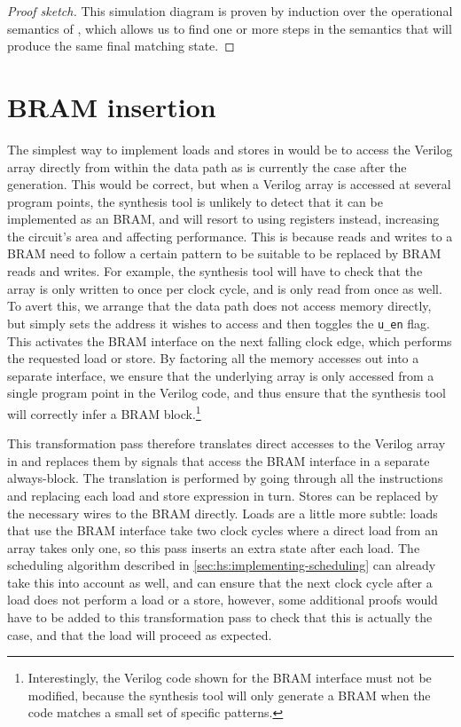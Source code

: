 \begin{proof}[Proof sketch]
  This simulation diagram is proven by induction over the operational semantics
  of \rtlsubpar{}, which allows us to find one or more steps in the \htl{} semantics that
  will produce the same final matching state.
\end{proof}

\section{BRAM insertion}%
\label{sec:hg:bram-insertion}

The simplest way to implement loads and stores in \vericert{} would be to access
the Verilog array directly from within the data path as is currently the case
after the \htl{} generation. This would be correct, but when a Verilog array is
accessed at several program points, the synthesis tool is unlikely to detect
that it can be implemented as an \gls{BRAM}, and will resort to using registers
instead, increasing the circuit's area and affecting performance.  This is
because reads and writes to a \gls{BRAM} need to follow a certain pattern to be
suitable to be replaced by \gls{BRAM} reads and writes.  For example, the
synthesis tool will have to check that the array is only written to once per
clock cycle, and is only read from once as well.  To avert this, we arrange that
the data path does not access memory directly, but simply sets the address it
wishes to access and then toggles the \texttt{u\_en} flag. This activates the
\gls{BRAM} interface on the next falling clock edge, which performs the
requested load or store. By factoring all the memory accesses out into a
separate interface, we ensure that the underlying array is only accessed from a
single program point in the Verilog code, and thus ensure that the synthesis
tool will correctly infer a \gls{BRAM} block.\footnote{Interestingly, the
  Verilog code shown for the \gls{BRAM} interface must not be modified, because
  the synthesis tool will only generate a \gls{BRAM} when the code matches a
  small set of specific patterns.}

This transformation pass therefore translates direct accesses to the Verilog
array in \htl{} and replaces them by signals that access the \gls{BRAM}
interface in a separate always-block. The translation is performed by going
through all the instructions and replacing each load and store expression in
turn.  Stores can be replaced by the necessary wires to the \gls{BRAM}
directly. Loads are a little more subtle: loads that use the \gls{BRAM}
interface take two clock cycles where a direct load from an array takes only
one, so this pass inserts an extra state after each load.  The scheduling
algorithm described in \cref{sec:hs:implementing-scheduling} can already take
this into account as well, and can ensure that the next clock cycle after a load
does not perform a load or a store, however, some additional proofs would have
to be added to this transformation pass to check that this is actually the case,
and that the load will proceed as expected.

